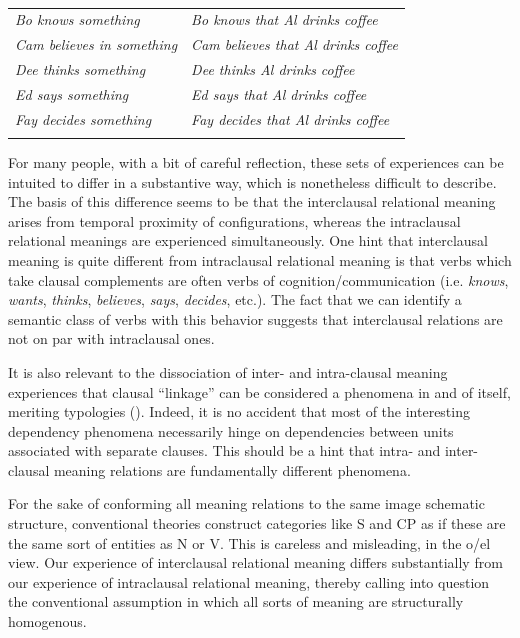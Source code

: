 \begin{table}
\begin{tabularx}{\textwidth}{XX}
\lsptoprule
\textit{Bo knows something} & \textit{Bo knows that Al drinks coffee}\\
\textit{Cam believes in something} & \textit{Cam believes that Al drinks coffee}\\
\textit{Dee thinks something}  & \textit{Dee thinks Al drinks coffee}\\
\textit{Ed says something} & \textit{Ed says that Al drinks coffee}\\
\textit{Fay decides something} & \textit{Fay decides that Al drinks coffee}\\
\lspbottomrule
\end{tabularx}
\caption{\missingcaption}\label{tab:5:1}
\end{table}
  For many people, with a bit of careful reflection, these sets of experiences can be intuited to differ in a substantive way, which is nonetheless difficult to describe. The basis of this difference seems to be that the interclausal relational meaning arises from temporal proximity of configurations, whereas the intraclausal relational meanings are experienced simultaneously. One hint that interclausal meaning is quite different from intraclausal relational meaning is that verbs which take clausal complements are often verbs of cognition/communication (i.e. \textit{knows}, \textit{wants}, \textit{thinks}, \textit{believes}, \textit{says}, \textit{decides}, etc.). The fact that we can identify a semantic class of verbs with this behavior suggests that interclausal relations are not on par with intraclausal ones. 

  It is also relevant to the dissociation of inter- and intra-clausal meaning experiences that clausal “linkage” can be considered a phenomena in and of itself, meriting typologies (\citealt{Bickel2010,Bril2010,Lehmann1988,VanValinJr1984}). Indeed, it is no accident that most of the interesting dependency phenomena necessarily hinge on dependencies between units associated with separate clauses. This should be a hint that intra- and inter-clausal meaning relations are fundamentally different phenomena.

  For the sake of conforming all meaning relations to the same image schematic structure, conventional theories construct categories like S and CP as if these are the same sort of entities as N or V. This is careless and misleading, in the o/el view. Our experience of interclausal relational meaning differs substantially from our experience of intraclausal relational meaning, thereby calling into question the conventional assumption in which all sorts of meaning are structurally homogenous.

